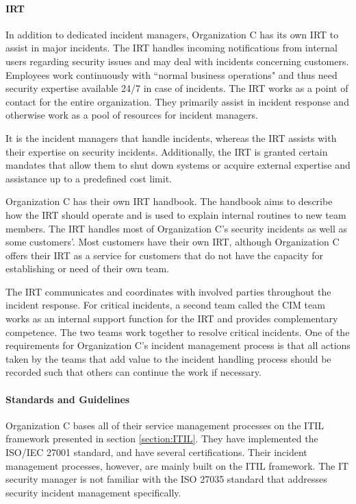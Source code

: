 \paragraph{\acl{IRT}}
In addition to dedicated incident managers, Organization C has its own \ac{IRT} to assist in major incidents. The \ac{IRT} handles incoming notifications from internal users regarding security issues and may deal with incidents concerning customers. Employees work continuously with ``normal business operations" and thus need security expertise available 24/7 in case of incidents. The \ac{IRT} works as a point of contact for the entire organization. They primarily assist in incident response and otherwise work as a pool of resources for incident managers. 

It is the incident managers that handle incidents, whereas the \ac{IRT} assists with their expertise on security incidents. Additionally, the \ac{IRT} is granted certain mandates that allow them to shut down systems or acquire external expertise and assistance up to a predefined cost limit.    

Organization C has their own \ac{IRT} handbook. The handbook aims to describe how the \ac{IRT} should operate and is used to explain internal routines to new team members. The \ac{IRT} handles most of Organization C's security incidents as well as some customers'. Most customers have their own \ac{IRT}, although Organization C offers their \ac{IRT} as a service for customers that do not have the capacity for establishing or need of their own team.

The \ac{IRT} communicates and coordinates with involved parties throughout the incident response. For critical incidents, a second team called the \ac{CIM} team works as an internal support function for the \ac{IRT} and provides complementary competence. The two teams work together to resolve critical incidents. One of the requirements for Organization C's incident management process is that all actions taken by the teams that add value to the incident handling process should be recorded such that others can continue the work if necessary.

\paragraph{Standards and Guidelines}
Organization C bases all of their service management processes on the ITIL framework presented in section \ref{section:ITIL}. They have implemented the ISO/IEC 27001 standard, and have several certifications. Their incident management processes, however, are mainly built on the ITIL framework. The IT security manager is not familiar with the ISO 27035 standard that addresses security incident management specifically. 

